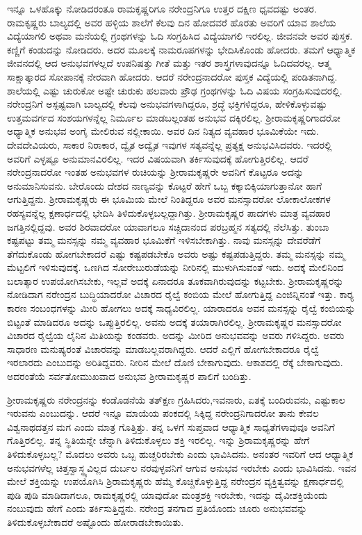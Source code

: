 ಇನ್ನೂ ಒಳಹೊಕ್ಕು ನೋಡಿದರಂತೂ ರಾಮಕೃಷ್ಣರಿಗೂ ನರೇಂದ್ರನಿಗೂ ಉತ್ತರ ದಕ್ಷಿಣ ಧೃವದಷ್ಟು ಅಂತರ. ರಾಮಕೃಷ್ಣರು ಬಾಲ್ಯದಲ್ಲಿ ಅವರ ಹಳ್ಳಿಯ ಶಾಲೆಗೆ ಕೆಲವು ದಿನ ಹೋದವರೆ ಹೊರತು ಅವರಿಗೆ ಯಾವ ಶಾಲೆಯ ವಿದ್ಯೆಯಾಗಲಿ ಅಥವಾ ಮನೆಯಲ್ಲಿ ಗ್ರಂಥಗಳನ್ನು ಓದಿ ಸಂಗ್ರಹಿಸಿದ ವಿದ್ಯೆಯಾಗಲಿ ಇರಲಿಲ್ಲ. ಜೀವನವೇ ಅವರ ಪುಸ್ತಕ. ಕಣ್ಣಿಗೆ ಕಂಡುದನ್ನು ನೋಡಿದರು. ಅದರ ಮೂಲಕ್ಕೆ ನಾಮರೂಪಗಳನ್ನು ಭೇದಿಸಿಕೊಂಡು ಹೋದರು. ತಮಗೆ ಆಧ್ಯಾತ್ಮಿಕ ಜೀವನದಲ್ಲಿ ಆದ ಅನುಭವಗಳಲ್ಲದೆ ಉಪನಿಷತ್ತು ಗೀತೆ ಮತ್ತು ಇತರ ಶಾಸ್ತ್ರಗಳಾವುದನ್ನೂ ಓದಿದವರಲ್ಲ. ಆತ್ಮ ಸಾಕ್ಷಾತ್ಕಾರದ ಸೋಪಾನಕ್ಕೆ ನೇರವಾಗಿ ಹೋದರು. ಆದರೆ ನರೇಂದ್ರನಾದರೋ ಪುಸ್ತಕ ವಿದ್ಯೆಯಲ್ಲಿ ಪಂಡಿತನಾಗಿದ್ದ. ಶಾಲೆಯಲ್ಲಿ ಎಷ್ಟು ಚುರುಕೋ ಅಷ್ಟೇ ಚುರುಕು ಹಲವಾರು ಪ್ರೌಢ ಗ್ರಂಥಗಳನ್ನು ಓದಿ ವಿಷಯ ಸಂಗ್ರಹಿಸುವುದರಲ್ಲಿ. ನರೇಂದ್ರನಿಗೆ ಅಸ್ಪಷ್ಟವಾಗಿ ಬಾಲ್ಯದಲ್ಲಿ ಕೆಲವು ಅನುಭವಗಳಾಗಿದ್ದರೂ, ಶ್ರದ್ಧೆ ಭಕ್ತಿಗಳಿದ್ದರೂ, ಹೇಳಿಕೊಳ್ಳುವಷ್ಟು ಉತ್ತಮವರ್ಗದ ಸಂಶಯಗಳನ್ನೆಲ್ಲ ನಿರ್ಮೂಲ ಮಾಡಬಲ್ಲಂತಹ ಅನುಭವ ದಕ್ಕಿರಲಿಲ್ಲ. ಶ‍್ರೀರಾಮಕೃಷ್ಣರಿಗಾದರೋ ಅಧ್ಯಾತ್ಮಿಕ ಅನುಭವ ಅಂಗೈ ಮೇಲಿರುವ ನಲ್ಲೀಕಾಯಿ. ಅವರ ದಿನ ನಿತ್ಯದ ವ್ಯವಹಾರ ಭೂಮಿಕೆಯೇ ಇದು. ದೇವದೇವಿಯರು, ಸಾಕಾರ ನಿರಾಕಾರ, ದ್ವೈತ ಅದ್ವೈತ ಇವುಗಳ ಸತ್ಯವನ್ನೆಲ್ಲ ಪ್ರತ್ಯಕ್ಷ ಅನುಭವಿಸಿದವರು. ಇದರಲ್ಲಿ ಅವರಿಗೆ ಎಳ್ಳಷ್ಟೂ ಅನುಮಾನವಿರಲಿಲ್ಲ. ಇದರ ವಿಷಯವಾಗಿ ತರ್ಕಿಸುವುದಕ್ಕೆ ಹೋಗುತ್ತಿರಲಿಲ್ಲ. ಆದರೆ ನರೇಂದ್ರನಾದರೋ ಇಂತಹ ಅನುಭವಗಳ ರುಚಿಯನ್ನು ಶ‍್ರೀರಾಮಕೃಷ್ಣರೇ ಅವನಿಗೆ ಕೊಟ್ಟರೂ ಅದನ್ನು ಅನುಮಾನಿಸುವನು. ಬೇರೊಂದು ದೇಶದ ನಾಣ್ಯವನ್ನು ಕೊಟ್ಟರೆ ಹೇಗೆ ಒಬ್ಬ ಕಕ್ಕಾಬಿಕ್ಕಿಯಾಗುತ್ತಾನೋ ಹಾಗೆ ಆಗುತ್ತಿದ್ದನು. ಶ‍್ರೀರಾಮಕೃಷ್ಣರು ಈ ಭೂಮಿಯ ಮೇಲೆ ನಿಂತಿದ್ದರೂ ಅವರ ಮನಸ್ಸಾದರೋ ಲೋಕಾಲೋಕಗಳ ರಹಸ್ಯವನ್ನೆಲ್ಲ ಕ್ಷಣಾರ್ಧದಲ್ಲಿ ಭೇದಿಸಿ ತಿಳಿದುಕೊಳ್ಳಬಲ್ಲದ್ದಾಗಿತ್ತು. ಶ‍್ರೀರಾಮಕೃಷ್ಣರ ಪಾದಗಳು ಮಾತ್ರ ವ್ಯವಹಾರ ಜಗತ್ತಿನಲ್ಲಿದ್ದವು. ಅವರ ಶಿರವಾದರೋ ಯಾವಾಗಲೂ ಸಚ್ಚಿದಾನಂದ ಪರಬ್ರಹ್ಮನ ಸತ್ಯದಲ್ಲಿ ನೆಲೆಸಿತ್ತು. ತುಂಬಾ ಕಷ್ಟಪಟ್ಟು ತಮ್ಮ ಮನಸ್ಸನ್ನು ನಮ್ಮ ವ್ಯವಹಾರ ಭೂಮಿಕೆಗೆ ಇಳಿಸಬೇಕಾಗಿತ್ತು. ನಾವು ಮನಸ್ಸನ್ನು ದೇವರೆಡೆಗೆ ತೆಗೆದುಕೊಂಡು ಹೋಗಬೇಕಾದರೆ ಎಷ್ಟು ಕಷ್ಟಪಡಬೇಕೊ ಅವರು ಅಷ್ಟು ಕಷ್ಟಪಡುತ್ತಿದ್ದರು. ತಮ್ಮ ಮನಸ್ಸನ್ನು ನಮ್ಮ ಮೆಟ್ಟಲಿಗೆ ಇಳಿಸುವುದಕ್ಕೆ. ಒಣಗಿದ ಸೋರೇಬುರುಡೆಯನ್ನು ನೀರಿನಲ್ಲಿ ಮುಳುಗಿಸುವಂತೆ ಇದು. ಅದಕ್ಕೆ ಮೇಲಿನಿಂದ ಬಲಾತ್ಕಾರ ಉಪಯೋಗಿಸಬೇಕು, ಇಲ್ಲವೆ ಅದಕ್ಕೆ ಏನಾದರೂ ತೂಕವಾಗಿರುವುದನ್ನು ಕಟ್ಟಬೇಕು. ಶ‍್ರೀರಾಮಕೃಷ್ಣರನ್ನು ನೋಡಿದಾಗ ನರೇಂದ್ರನ ಬುದ್ಧಿಯಾದರೋ ವಿಚಾರದ ರೈಲ್ವೆ ಕಂಬಿಯ ಮೇಲೆ ಹೋಗುತ್ತಿದ್ದ ಎಂಜಿನ್ನಿನಂತೆ ಇತ್ತು. ಕಾರ‍್ಯ ಕಾರಣ ಸಂಬಂಧಗಳನ್ನು ಮೀರಿ ಹೋಗಲು ಅದಕ್ಕೆ ಸಾಧ್ಯವಿರಲಿಲ್ಲ. ಯಾರಾದರೂ ಅವನ ಮನಸ್ಸನ್ನು ರೈಲ್ವೆ ಕಂಬಿಯನ್ನು ಬಿಟ್ಟಂತೆ ಮಾಡಿದರೂ ಅದನ್ನು ಒಪ್ಪುತ್ತಿರಲಿಲ್ಲ. ಅವನು ಅದಕ್ಕೆ ತಯಾರಾಗಿರಲಿಲ್ಲ. ಶ‍್ರೀರಾಮಕೃಷ್ಣರ ಮನಸ್ಸಾದರೋ ವಿಚಾರದ ರೈಲ್ವೆಯ ಲೈನಿನ ಮಿತಿಯನ್ನು ಕಂಡವರು. ಅದನ್ನು ಮೀರಿದ ಅನುಭವವನ್ನು ಅವರು ಗಳಿಸಿದ್ದರು. ಅವರು ಸಾಧಾರಣ ಮನುಷ್ಯರಂತೆ ವಿಚಾರವನ್ನು ಮಾಡಬಲ್ಲವರಾಗಿದ್ದರು. ಆದರೆ ಎಲ್ಲಿಗೆ ಹೋಗಬೇಕಾದರೂ ರೈಲ್ವೆ ಇರಲಾರದು ಎಂಬುದನ್ನು ಅರಿತಿದ್ದವರು. ನೀರಿನ ಮೇಲೆ ದೊಣಿ ಬೇಕಾಗುವುದು. ಆಕಾಶದಲ್ಲಿ ರೆಕ್ಕೆ ಬೇಕಾಗುವುದು. ಅದರಂತೆಯೆ ಸರ್ವತೋಮುಖವಾದ ಅನುಭವ ಶ‍್ರೀರಾಮಕೃಷ್ಣರ ಪಾಲಿಗೆ ಬಂದಿತ್ತು.

ಶ‍್ರೀರಾಮಕೃಷ್ಣರು ನರೇಂದ್ರನನ್ನು ಕಂಡೊಡನೆಯೆ ತತ್‍ಕ್ಷಣ ಗ್ರಹಿಸಿದರು,\break ಇವನಾರು, ಏತಕ್ಕೆ ಬಂದಿರುವನು, ಎಷ್ಟುಕಾಲ ಇರುವನು ಎಂಬುದನ್ನು. ಆದರೆ ಇನ್ನೂ ಮಾಯೆಯ ಪಂಕದಲ್ಲಿ ಸಿಕ್ಕಿದ್ದ ನರೇಂದ್ರನಿಗಾದರೋ ತಾನು ಕೇವಲ ವಿಶ್ವನಾಥದತ್ತನ ಮಗ ಎಂದು ಮಾತ್ರ ಗೊತ್ತಿತ್ತು. ತನ್ನ ಒಳಗೆ ಸುಪ್ತವಾದ ಆಧ್ಯಾತ್ಮಿಕ ಸಾಧ್ಯತೆಗಳಾವುವೂ ಅವನಿಗೆ ಗೊತ್ತಿರಲಿಲ್ಲ. ತನ್ನ ಸ್ಥಿತಿಯನ್ನೇ ಚೆನ್ನಾಗಿ ತಿಳಿದುಕೊಳ್ಳಲು ಶಕ್ತಿ ಇರಲಿಲ್ಲ. ಇನ್ನು ಶ್ರಿರಾಮಕೃಷ್ಣರನ್ನು ಹೇಗೆ ತಿಳಿದುಕೊಳ್ಳಬಲ್ಲ? ಮೊದಲು ಅವರು ಒಬ್ಬ ಹುಚ್ಚರಿರಬೇಕು ಎಂದು ಭಾವಿಸಿದನು. ಅನಂತರ ಇವರಿಗೆ ಆದ ಆಧ್ಯಾತ್ಮಿಕ ಅನುಭವಗಳೆಲ್ಲ ಚಿತ್ತಸ್ವಾಸ್ಥ್ಯವಿಲ್ಲದ ದುರ್ಬಲ ನರವುಳ್ಳವನಿಗೆ ಆಗುವ ಅನುಭವ ಇರಬೇಕು ಎಂದು ಭಾವಿಸಿದನು. ಇವನ ಮೇಲೆ ಶಕ್ತಿಯನ್ನು ಉಪಯೊಗಿಸಿ ಶ್ರಿರಾಮಕೃಷ್ಣರು ಹೆಮ್ಮೆ ಕೊಚ್ಚಿಕೊಳ್ಳುತ್ತಿದ್ದ ನರೇಂದ್ರನ ವ್ಯಕ್ತಿತ್ವವನ್ನು ಕ್ಷಣಾರ್ಧದಲ್ಲಿ ಪುಡಿ ಪುಡಿ ಮಾಡಿದಾಗಲೂ, ರಾಮಕೃಷ್ಣರಲ್ಲಿ ಯಾವುದೋ ಮಂತ್ರಶಕ್ತಿ ಇರಬೇಕು, ಇದನ್ನು ದೈವೀಶಕ್ತಿಯೆಂದು ನಂಬುವುದು ಹೇಗೆ ಎಂದು ತರ್ಕಿಸುತ್ತಿದ್ದನು. ನರೇಂದ್ರ ತನಗಾದ ಪ್ರತಿಯೊಂದು ಚೂರು ಅನುಭವವನ್ನು ತಿಳಿದುಕೊಳ್ಳಬೇಕಾದರೆ ಅಷ್ಟೊಂದು ಹೋರಾಡಬೇಕಾಯಿತು.

